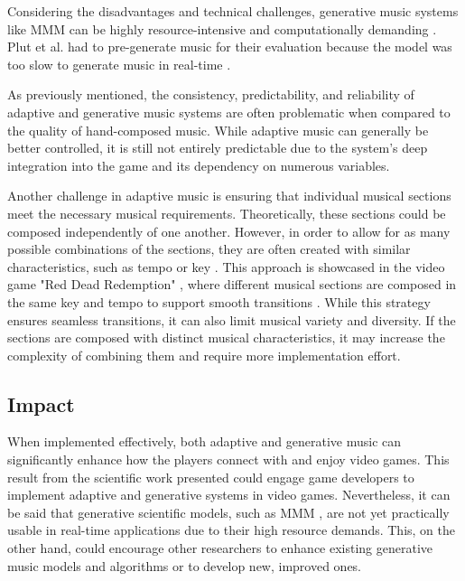Considering the disadvantages and technical challenges, generative music systems like MMM \cite{ens2020mmm} can be highly resource-intensive and computationally demanding \cite{plut2022preglam}. Plut et al. had to pre-generate music for their evaluation because the model was too slow to generate music in real-time \cite{plut2022preglam}.

As previously mentioned, the consistency, predictability, and reliability of adaptive and generative music systems are often problematic when compared to the quality of hand-composed music. While adaptive music can generally be better controlled, it is still not entirely predictable due to the system's deep integration into the game and its dependency on numerous variables.

Another challenge in adaptive music is ensuring that individual musical sections meet the necessary musical requirements. Theoretically, these sections could be composed independently of one another. However, in order to allow for as many possible combinations of the sections, they are often created with similar characteristics, such as tempo or key \cite{plut2020generative}. This approach is showcased in the video game "Red Dead Redemption" \cite{reddeadredemption2010}, where different musical sections are composed in the same key and tempo to support smooth transitions \cite{plut2020generative}.
While this strategy ensures seamless transitions, it can also limit musical variety and diversity. If the sections are composed with distinct musical characteristics, it may increase the complexity of combining them and require more implementation effort.


\subsection{Impact}
When implemented effectively, both adaptive and generative music can significantly enhance how the players connect with and enjoy video games. This result from the scientific work presented could engage game developers to implement adaptive and generative systems in video games. 
Nevertheless, it can be said that generative scientific models, such as MMM \cite{ens2020mmm}, are not yet practically usable in real-time applications due to their high resource demands. This, on the other hand, could encourage other researchers to enhance existing generative music models and algorithms or to develop new, improved ones.